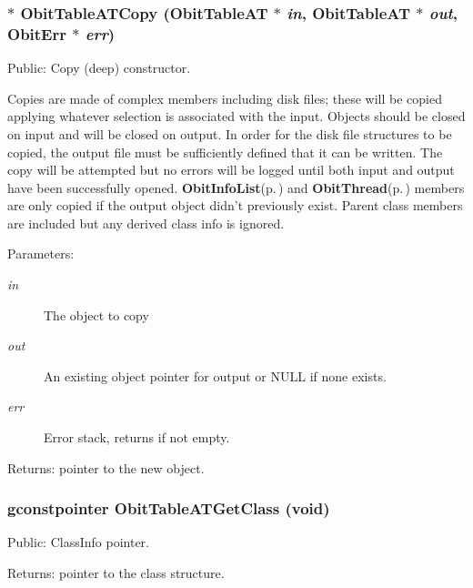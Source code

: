 \subsubsection{$\ast$ Obit\-Table\-ATCopy ({\bf Obit\-Table\-AT} $\ast$ {\em in}, {\bf Obit\-Table\-AT} $\ast$ {\em out}, {\bf Obit\-Err} $\ast$ {\em err})}\label{ObitTableAT_8c_a20}


Public: Copy (deep) constructor. 

Copies are made of complex members including disk files; these will be copied applying whatever selection is associated with the input. Objects should be closed on input and will be closed on output. In order for the disk file structures to be copied, the output file must be sufficiently defined that it can be written. The copy will be attempted but no errors will be logged until both input and output have been successfully opened. {\bf Obit\-Info\-List}{\rm (p.\,\pageref{structObitInfoList})} and {\bf Obit\-Thread}{\rm (p.\,\pageref{structObitThread})} members are only copied if the output object didn't previously exist. Parent class members are included but any derived class info is ignored. \begin{Desc}
\item[Parameters:]
\begin{description}
\item[{\em in}]The object to copy \item[{\em out}]An existing object pointer for output or NULL if none exists. \item[{\em err}]Error stack, returns if not empty. \end{description}
\end{Desc}
\begin{Desc}
\item[Returns:]pointer to the new object. \end{Desc}
\subsubsection{\setlength{\rightskip}{0pt plus 5cm}gconstpointer Obit\-Table\-ATGet\-Class (void)}\label{ObitTableAT_8c_a17}


Public: Class\-Info pointer. 

\begin{Desc}
\item[Returns:]pointer to the class structure. \end{Desc}
